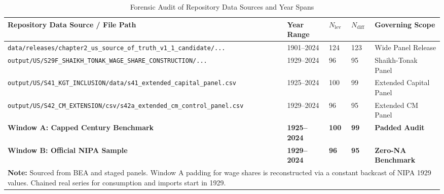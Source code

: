 \begin{table}[h!]
\centering
\small
\caption{Forensic Audit of Repository Data Sources and Year Spans}
\label{tab:sample_audit}
\begin{tabular}{p{7.0cm} p{2.2cm} p{1.6cm} p{1.6cm} p{2.2cm}}
\toprule
\textbf{Repository Data Source / File Path} & \textbf{Year Range} & \textbf{$N_{\text{lev}}$} & \textbf{$N_{\text{diff}}$} & \textbf{Governing Scope} \\
\midrule
\texttt{data/releases/chapter2\_us\_source\_of\_truth\_v1\_1\_candidate/...} & 1901--2024 & 124 & 123 & Wide Panel Release \\
\texttt{output/US/S29F\_SHAIKH\_TONAK\_WAGE\_SHARE\_CONSTRUCTION/...} & 1929--2024 & 96 & 95 & Shaikh-Tonak Panel \\
\texttt{output/US/S41\_KGT\_INCLUSION/data/s41\_extended\_capital\_panel.csv} & 1925--2024 & 100 & 99 & Extended Capital Panel \\
\texttt{output/US/S42\_CM\_EXTENSION/csv/s42a\_extended\_cm\_control\_panel.csv} & 1929--2024 & 96 & 95 & Extended CM Panel \\
\textbf{Window A: Capped Century Benchmark} & \textbf{1925--2024} & \textbf{100} & \textbf{99} & \textbf{Padded Audit} \\
\textbf{Window B: Official NIPA Sample} & \textbf{1929--2024} & \textbf{96} & \textbf{95} & \textbf{Zero-NA Benchmark} \\
\bottomrule
\multicolumn{5}{p{14.6cm}}{\footnotesize \textbf{Note:} Sourced from BEA and staged panels. Window A padding for wage shares is reconstructed via a constant backcast of NIPA 1929 values. Chained real series for consumption and imports start in 1929.}
\end{tabular}
\end{table}
